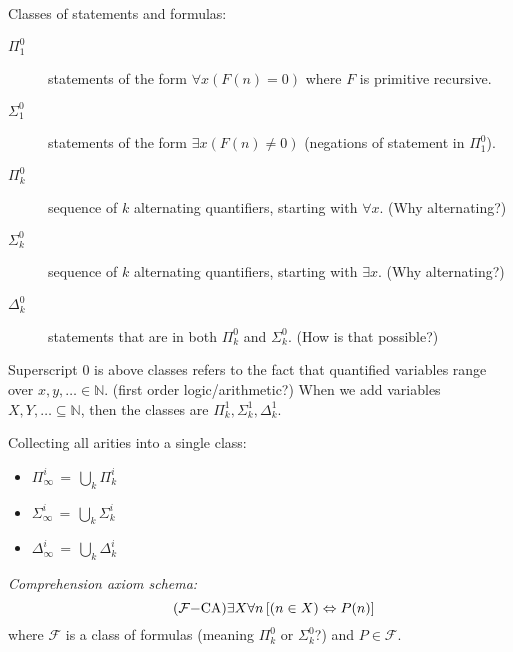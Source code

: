 \cite[ch~11 ``G\"{o}del's \textit{Dialectica} interpretation and its
two-way-stretch'']{Feferman1998LightOfLogic}

\label{sec:Cantor_necessary_conclusion}

\cite[ch~12 ``Infinity in mathematics: is Cantor necessary? (conclusion)'']{Feferman1998LightOfLogic}

Classes of statements and formulas:
\begin{description}
\item[$\Pi^0_1$] statements of the form
$\forall x (F(n) = 0)$ where $F$ is primitive recursive.
\item[$\Sigma^0_1$] statements of the form
$\exists x (F(n) \neq 0)$ (negations of statement in $\Pi^0_1$).
\item[$\Pi^0_k$] sequence of $k$ alternating quantifiers,
starting with $\forall x$.
\textsf{(Why alternating?)}
\item[$\Sigma^0_k$] sequence of $k$ alternating quantifiers,
starting with $\exists x$.
\textsf{(Why alternating?)}
\item[$\Delta^0_k$] statements that are in both $\Pi^0_k$
and $\Sigma^0_k$. 
\textsf{(How is that possible?)}
\end{description}
Superscript $0$ is above classes refers to the fact that
quantified variables range over $x,y,\ldots \in \mathbb{N}$.
\textsf{(first order logic/arithmetic?)}
When we add variables $X,Y,\ldots \subseteq \mathbb{N}$,
then the classes are $\Pi^1_k, \Sigma^1_k, \Delta^1_k$.

Collecting all arities into a single class:
\begin{itemize}
  \item $\Pi^i_{\infty} \, = \, \bigcup_k \Pi^i_k$
  \item $\Sigma^i_{\infty} \, = \, \bigcup_k \Sigma^i_k$
  \item $\Delta^i_{\infty} \, = \, \bigcup_k \Delta^i_k$
\end{itemize}

\textit{Comprehension axiom schema:}
\begin{equation}
\tag{$\mathcal{F}{-}\text{CA}$}
\exists X \forall n \left[ (n \in X) \Leftrightarrow P(n) \right]
\end{equation}
where $\mathcal{F}$ is a class of formulas 
\textsf{(meaning $\Pi^0_k$ or $\Sigma^0_k$?)}
and $P \in \mathcal{F}$.

